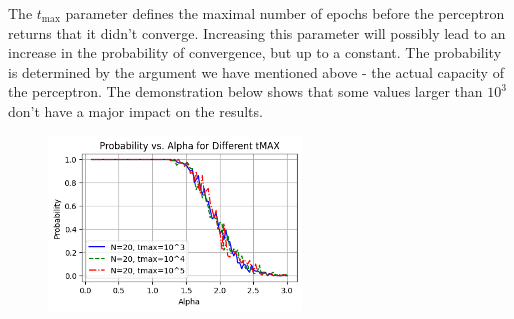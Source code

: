 \documentclass[a4paper, 12pt]{article}
\begin{document}
\vspace{24pt} 

The $t_{\text{max}}$ parameter defines the maximal number of epochs before the perceptron
returns that it didn't converge. Increasing this parameter will possibly lead to 
an increase in the probability of convergence, but up to a constant. The probability 
is determined by the argument we have mentioned above - the actual capacity of 
the perceptron. 
The demonstration below shows that some values larger than $10^3$ don't have a major impact
on the results.

\begin{figure}[h]
    \centering
    \includegraphics[width=0.6\textwidth]{./assets/nn_ex1_3_3_2.png}
\end{figure}
\end{document}
